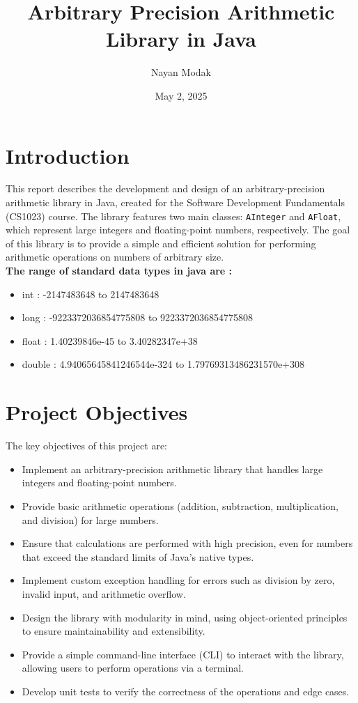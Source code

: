 \documentclass[12pt]{article}
\title{Arbitrary Precision Arithmetic Library in Java}
\author{Nayan Modak}
\date{May 2, 2025}
\begin{document}
\maketitle

\tableofcontents

\newpage

\section{Introduction}
This report describes the development and design of an arbitrary-precision arithmetic library in Java, created for the Software Development Fundamentals (CS1023) course. The library features two main classes: \texttt{AInteger} and \texttt{AFloat}, which represent large integers and floating-point numbers, respectively. The goal of this library is to provide a simple and efficient solution for performing arithmetic operations on numbers of arbitrary size.
\\ \textbf{The range of standard data types in java are :}
\begin{itemize}
    \item int : -2147483648 to 2147483648
    \item long : -9223372036854775808 to 9223372036854775808
    \item float : 1.40239846e-45 to 3.40282347e+38
    \item double : 4.94065645841246544e-324 to 1.79769313486231570e+308 
\end{itemize}
\section{Project Objectives}
The key objectives of this project are:
\begin{itemize}
    \item Implement an arbitrary-precision arithmetic library that handles large integers and floating-point numbers.
    \item Provide basic arithmetic operations (addition, subtraction, multiplication, and division) for large numbers.
    \item Ensure that calculations are performed with high precision, even for numbers that exceed the standard limits of Java's native types.
    \item Implement custom exception handling for errors such as division by zero, invalid input, and arithmetic overflow.
    \item Design the library with modularity in mind, using object-oriented principles to ensure maintainability and extensibility.
    \item Provide a simple command-line interface (CLI) to interact with the library, allowing users to perform operations via a terminal.
    \item Develop unit tests to verify the correctness of the operations and edge cases.
\end{itemize}
\end{document}
